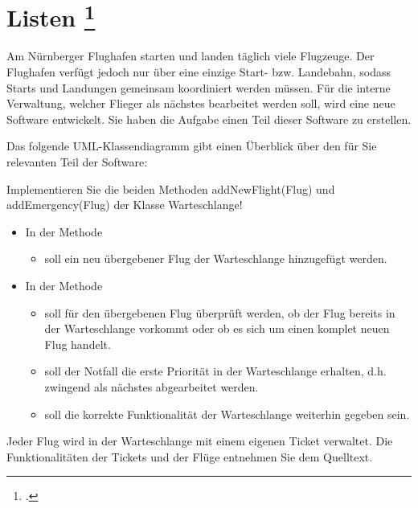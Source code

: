 \documentclass{lehramt-informatik-aufgabe}
\begin{document}

\section{Listen
\footcite[Aufgabe 3]{aud:e-klausur}}

Am Nürnberger Flughafen starten und landen täglich viele Flugzeuge. Der
Flughafen verfügt jedoch nur über eine einzige Start- bzw. Landebahn,
sodass Starts und Landungen gemeinsam koordiniert werden müssen. Für die
interne Verwaltung, welcher Flieger als nächstes bearbeitet werden soll,
wird eine neue Software entwickelt. Sie haben die Aufgabe einen Teil
dieser Software zu erstellen.

Das folgende UML-Klassendiagramm gibt einen Überblick über den für Sie
relevanten Teil der Software:

Implementieren Sie die beiden Methoden addNewFlight(Flug) und
addEmergency(Flug) der Klasse Warteschlange!

\begin{itemize}
\item In der Methode 

\begin{itemize}
\item soll ein neu übergebener Flug der Warteschlange hinzugefügt werden.
\end{itemize}

\item In der Methode 

\begin{itemize}
\item soll für den übergebenen Flug überprüft werden, ob der Flug
bereits in der Warteschlange vorkommt oder ob es sich um einen komplet
neuen Flug handelt.

\item soll der Notfall die erste Priorität in der Warteschlange
erhalten, d.h. zwingend als nächstes abgearbeitet werden.

\item soll die korrekte Funktionalität der Warteschlange weiterhin
gegeben sein.
\end{itemize}
\end{itemize}

Jeder Flug wird in der Warteschlange mit einem eigenen Ticket verwaltet.
Die Funktionalitäten der Tickets und der Flüge entnehmen Sie dem
Quelltext.

\begin{antwort}





\end{antwort}
\end{document}
